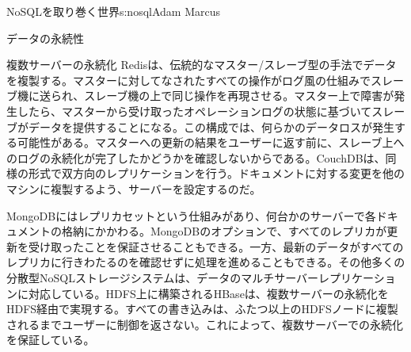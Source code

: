 \begin{aosachapter}{NoSQLを取り巻く世界}{s:nosql}{Adam Marcus}
\begin{aosasect1}{データの永続性}
\begin{aosasect2}{複数サーバーの永続化}
Redisは、伝統的なマスター/スレーブ型の手法でデータを複製する。マスターに対してなされたすべての操作がログ風の仕組みでスレーブ機に送られ、スレーブ機の上で同じ操作を再現させる。マスター上で障害が発生したら、マスターから受け取ったオペレーションログの状態に基づいてスレーブがデータを提供することになる。この構成では、何らかのデータロスが発生する可能性がある。マスターへの更新の結果をユーザーに返す前に、スレーブ上へのログの永続化が完了したかどうかを確認しないからである。CouchDBは、同様の形式で双方向のレプリケーションを行う。ドキュメントに対する変更を他のマシンに複製するよう、サーバーを設定するのだ。

MongoDBにはレプリカセットという仕組みがあり、何台かのサーバーで各ドキュメントの格納にかかわる。MongoDBのオプションで、すべてのレプリカが更新を受け取ったことを保証させることもできる。一方、最新のデータがすべてのレプリカに行きわたるのを確認せずに処理を進めることもできる。その他多くの分散型NoSQLストレージシステムは、データのマルチサーバーレプリケーションに対応している。HDFS上に構築されるHBaseは、複数サーバーの永続化をHDFS経由で実現する。すべての書き込みは、ふたつ以上のHDFSノードに複製されるまでユーザーに制御を返さない。これによって、複数サーバーでの永続化を保証している。


\end{aosasect2}
\end{aosasect1}
\end{aosachapter}
